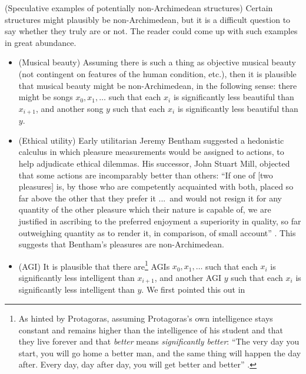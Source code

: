 \documentclass[twoside,11pt]{article}
\begin{document}
\begin{example}
\label{speculativeexamples}
    (Speculative examples of potentially non-Archimedean structures)
    Certain structures might plausibly be non-Archimedean, but it is a difficult
    question to say whether they truly are or not. The reader could come up with
    such examples in great abundance.
    \begin{itemize}
        \item
        (Musical beauty)
        Assuming there is such a thing as objective
        musical beauty (not contingent on features of the human condition, etc.),
        then it is plausible that musical beauty might be non-Archimedean, in the following
        sense: there might be songs $x_0,x_1,\ldots$ such that each $x_i$
        is significantly less beautiful than $x_{i+1}$, and another song
        $y$ such that each $x_i$ is significantly less beautiful than $y$.
        \item
        (Ethical utility)
        Early utilitarian Jeremy Bentham suggested a hedonistic
        calculus in which pleasure measurements would be assigned to
        actions, to help adjudicate ethical dilemmas.
        His successor, John Stuart Mill, objected that some actions are incomparably
        better than others: ``If one of [two pleasures] is, by those
        who are competently acquainted with both, placed so far above the other that
        they prefer it ...\ and would not resign it for any quantity of the other
        pleasure which their nature is capable of, we are justified in ascribing to
        the preferred enjoyment a superiority in quality, so far outweighing quantity
        as to render it, in comparison, of small account'' \citep{mill}.
        This suggests that Bentham's pleasures are non-Archimedean.
        \item
        (AGI)
        It is plausible that there
        are\footnote{As hinted by Protagoras, assuming Protagoras's own intelligence
        stays constant and remains higher than the intelligence of his student
        and that they live forever and that \emph{better} means \emph{significantly
        better}:
        ``The very day you start, you will go home a better man, and the same thing
        will happen the day after. Every day, day after day, you will get better
        and better'' \citep{protagoras}.} AGIs $x_0,x_1,\ldots$ such that
        each $x_{i}$ is significantly less
        intelligent than $x_{i+1}$, and another AGI $y$ such that each $x_i$
        is significantly less
        intelligent than $y$. We first pointed this out in

\end{itemize}
\end{example}
\end{document}
